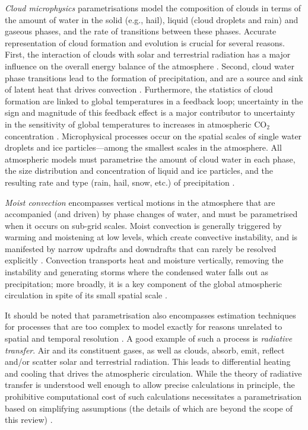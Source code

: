\documentclass[titlepage,twoside]{article}
\numberwithin{equation}{section}
\begin{document}
\emph{Cloud microphysics} parametrisations model the composition of clouds in
terms of the amount of water in the solid (e.g., hail), liquid (cloud droplets
and rain) and gaseous phases, and the rate of transitions between these phases.
Accurate representation of cloud formation and evolution is crucial for several
reasons. First, the interaction of clouds with solar and terrestrial radiation
has a major influence on the overall energy balance of the atmosphere
\parencite{mcfarlane2011}. Second, cloud water phase transitions lead to the
formation of precipitation, and are a source and sink of latent heat that
drives convection \parencite{mcfarlane2011}. Furthermore, the statistics of
cloud formation are linked to global temperatures in a feedback loop;
uncertainty in the sign and magnitude of this feedback effect is a major
contributor to uncertainty in the sensitivity of global temperatures to
increases in atmospheric CO$_2$ concentration \parencite{andrews2012,
christensen2022,stevens2013}. Microphysical processes occur on the spatial
scales of single water droplets and ice particles---among the smallest scales
in the atmosphere. All atmospheric models must parametrise the amount of cloud
water in each phase, the size distribution and concentration of liquid and ice
particles, and the resulting rate and type (rain, hail, snow, etc.) of
precipitation \parencite{christensen2022}.

\emph{Moist convection} encompasses vertical motions in the atmosphere that are
accompanied (and driven) by phase changes of water, and must be parametrised
when it occurs on sub-grid scales. Moist convection is generally triggered by
warming and moistening at low levels, which create convective instability, and
is manifested by narrow updrafts and downdrafts that can rarely be resolved
explicitly \parencite{mcfarlane2011}. Convection transports heat and moisture
vertically, removing the instability and generating storms where the condensed
water falls out as precipitation; more broadly, it is a key component of the
global atmospheric circulation in spite of its small spatial scale
\parencite{christensen2022}.

It should be noted that parametrisation also encompasses estimation techniques
for processes that are too complex to model exactly for reasons unrelated to
spatial and temporal resolution \parencite{mcfarlane2011}. A good example of
such a process is \emph{radiative transfer}. Air and its constituent gases, as
well as clouds, absorb, emit, reflect and/or scatter solar and terrestrial
radiation. This leads to differential heating and cooling that drives the
atmospheric circulation. While the theory of radiative transfer is understood
well enough to allow precise calculations in principle, the prohibitive
computational cost of such calculations necessitates a parametrisation based on
simplifying assumptions (the details of which are beyond the scope of this
review) \parencite{christensen2022}.
\end{document}

